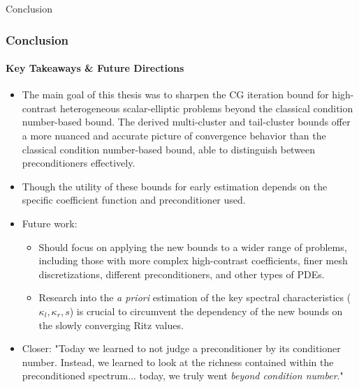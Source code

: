 \begin{frame}[label=conclusion]{Conclusion}
    \frametitle{Conclusion}
    \framesubtitle{Key Takeaways \& Future Directions}
    \begin{itemize}
        \item<1> The main goal of this thesis was to sharpen the CG iteration bound for high-contrast heterogeneous scalar-elliptic problems beyond the classical condition number-based bound. The derived multi-cluster and tail-cluster bounds offer a more nuanced and accurate picture of convergence behavior than the classical condition number-based bound, able to distinguish between preconditioners effectively.
        \item<2> Though the utility of these bounds for early estimation depends on the specific coefficient function and preconditioner used.
        \item<3> Future work:
        \begin{itemize}
            \item Should focus on applying the new bounds to a wider range of problems, including those with more complex high-contrast coefficients, finer mesh discretizations, different preconditioners, and other types of PDEs.
            \item Research into the \textit{a priori} estimation of the key spectral characteristics ($\kappa_l, \kappa_r, s$) is crucial to circumvent the dependency of the new bounds on the slowly converging Ritz values.
        \end{itemize}
        \item<4> Closer: "Today we learned to not judge a preconditioner by its conditioner number. Instead, we learned to look at the richness contained within the preconditioned spectrum... today, we truly went \textit{beyond condition number}."
    \end{itemize}
\end{frame}